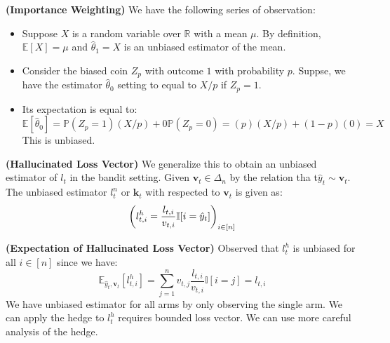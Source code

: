\begin{definition}{\textbf{(Importance Weighting)}}
    We have the following series of observation:
    \begin{itemize}
        \item Suppose $X$ is a random variable over $\mathbb{R}$ with a mean $\mu$. By definition, $\mathbb{E}[X] = \mu$ and $\hat{\theta}_1 = X$ is an unbiased estimator of the mean. 
        \item Consider the biased coin $Z_p$ with outcome $1$ with probability $p$. Suppse, we have the estimator $\hat{\theta}_0$ setting to equal to $X/p$ if $Z_p = 1$. 
        \item Its expectation is equal to:
        \begin{equation*}
            \mathbb{E}[\hat{\theta}_0] = \mathbb{P}(Z_p = 1)(X/p) + 0 \mathbb{P}(Z_p = 0) = (p)(X/p) + (1-p)(0) = X
        \end{equation*}
        This is unbiased. 
    \end{itemize} 
\end{definition}

\begin{definition}{\textbf{(Hallucinated Loss Vector)}}
    We generalize this to obtain an unbiased estimator of $l_t$ in the bandit setting. Given $\boldsymbol v_t \in \Delta_n$  by the relation tha t$\hat{y}_t \sim \boldsymbol v_t$. The unbiased estimator $l^n_t$ or $\boldsymbol k_t$ with respected to $\boldsymbol v_t$ is given as:
    \begin{equation*}
        \left( l^h_{t, i} = \frac{l_{t, i}}{v_{t, i}} \mathbb{I}[i = \hat{y}_t]  \right)_{i \in [n]}
    \end{equation*}
\end{definition}

\begin{remark}{\textbf{(Expectation of Hallucinated Loss Vector)}}
    Observed that $l^h_t$ is unbiased for all $i\in[n]$ since we have:
    \begin{equation*}
        \mathbb{E}_{\hat{y}_t, \boldsymbol v_t}[l^h_{t, i}] = \sum^n_{j=1}v_{t, j}\frac{l_{t, i}}{v_{t, i}} \mathbb{I}[i = j] = l_{t, i}
    \end{equation*}
    We have unbiased estimator for all arms by only observing the single arm. We can apply the hedge to $l^h_t$ requires bounded loss vector. We can use more careful analysis of the hedge. 
\end{remark}

